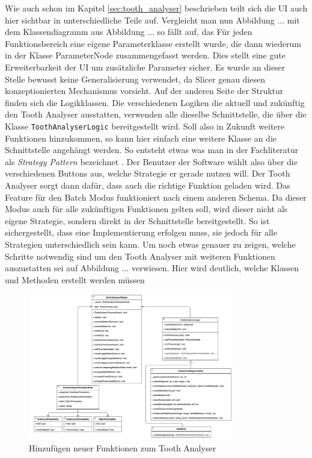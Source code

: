 Wie auch schon im Kapitel \ref{sec:tooth_analyser} beschrieben teilt sich die \ac{UI}
auch hier sichtbar in unterschiedliche Teile auf. Vergleicht man nun Abbildung ...
mit dem Klassendiagramm aus Abbildung ... so fällt auf, das Für jeden
Funktionsbereich eine eigene Parameterklasse erstellt wurde, die dann wiederum in
der Klasse ParameterNode zusammengefasst werden. Dies stellt eine gute
Erweiterbarkeit der \ac{UI} um zusätzliche Parameter sicher. Es wurde an dieser
Stelle bewusst keine Generalisierung verwendet, da Slicer genau diesen konzeptionierten
Mechanismus vorsieht. Auf der anderen Seite der Struktur finden sich die
Logikklassen. Die verschiedenen Logiken die aktuell und zukünftig den Tooth Analyser
ausstatten, verwenden alle dieselbe Schnittstelle, die über die Klasse \texttt{ToothAnalyserLogic}
bereitgestellt wird. Soll also in Zukunft weitere Funktionen hinzukommen, so
kann hier einfach eine weitere Klasse an die Schnittstelle angehängt werden. So entsteht
etwas was man in der Fachliteratur als \textit{Strategy Pattern} bezeichnet
\citep[vgl.][S. ...]{siebler2014}. Der Benutzer der Software wählt also über die
verschiedenen Buttons aus, welche Strategie er gerade nutzen will. Der Tooth
Analyser sorgt dann dafür, dass auch die richtige Funktion geladen wird. Das
Feature für den Batch Modus funktioniert nach einem anderen Schema. Da dieser Modus
auch für alle zukünftigen Funktionen gelten soll, wird dieser nicht als eigene
Strategie, sondern direkt in der Schnittstelle bereitgestellt. So ist
sichergestellt, dass eine Implementierung erfolgen muss, sie jedoch für alle
Strategien unterschiedlich sein kann. Um noch etwas genauer zu zeigen, welche
Schritte notwendig sind um den Tooth Analyser mit weiteren Funktionen
auszustatten sei auf Abbildung ... verwiesen. Hier wird deutlich, welche Klassen
und Methoden erstellt werden müssen

\begin{figure}[h]
	\centering
	\includegraphics[width=0.8\textwidth]{img/toothAnalyserClasses.png}
	\caption{Hinzufügen neuer Funktionen zum Tooth Analyser}
	\label{fig:klassendiagramm_new}
\end{figure}

